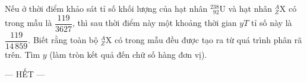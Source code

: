 	\begin{ex}%
		\label{PhuTho-SoGD-Lan2-III6}Nếu ở thời điểm khảo sát tỉ số khối lượng của hạt nhân $^{238}_{\phantom{2}92}\text{U}$ và hạt nhân ${}^A_Z\text{X}$ có trong mẫu là $\dfrac{119}{3627}$, thì sau thời điểm này một khoảng thời gian $yT$ tỉ số này là $\dfrac{119}{14\,859}$. Biết rằng toàn bộ ${}^A_Z\text{X}$ có trong mẫu đều được tạo ra từ quá trình phân rã trên. Tìm $y$ (làm tròn kết quả đến chữ số hàng đơn vị).
		\par
	\end{ex}

	\centerline{--- HẾT ---}


